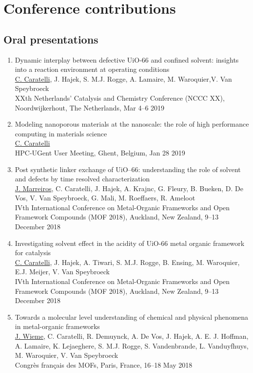 \section*{Conference contributions}
\subsection*{Oral presentations}
\begin{enumerate}

\item
Dynamic interplay between defective UiO-66 and confined solvent: insights into a reaction environment at operating conditions\\
\underline{C. Caratelli}, J. Hajek, S. M.J. Rogge, A. Lamaire, M. Waroquier,V. Van Speybroeck\\
XXth Netherlands' Catalysis and Chemistry Conference (NCCC XX), Noordwijkerhout, The Netherlands, Mar 4--6 2019

\item
Modeling nanoporous materials at the nanoscale: the role of high performance computing in materials science\\
\underline{C. Caratelli}\\
HPC-UGent User Meeting, Ghent, Belgium, Jan 28 2019

\item
Post synthetic linker exchange of UiO--66: understanding the role of solvent and defects by time resolved characterization\\
\underline{J. Marreiros}, C. Caratelli, J. Hajek, A. Krajnc, G. Fleury, B. Bueken, D. De Vos, V. Van Speybroeck, G. Mali, M. Roeffaers, R. Ameloot\\
IVth International Conference on Metal-Organic Frameworks and Open Framework Compounds (MOF 2018),
Auckland, New Zealand, 9--13 December 2018

\item
Investigating solvent effect in the acidity of UiO-66 metal organic framework for catalysis\\
\underline{C. Caratelli}, J. Hajek, A. Tiwari, S. M.J. Rogge, B. Ensing, M. Waroquier, E.J. Meijer, V. Van Speybroeck\\
IVth International Conference on Metal-Organic Frameworks and Open Framework Compounds (MOF 2018),
Auckland, New Zealand, 9--13 December 2018

\item
Towards a molecular level understanding of chemical and physical phenomena in metal-organic
frameworks\\
\underline{J. Wieme}, C. Caratelli, R. Demuynck, A. De Vos, J. Hajek, A. E. J. Hoffman, A. Lamaire, K. Lejaeghere, S. M.J. Rogge, S. Vandenbrande, L. Vanduyfhuys, M. Waroquier, V. Van Speybroeck\\
Congrès français des MOFs, Paris, France, 16--18 May 2018


\end{enumerate}
